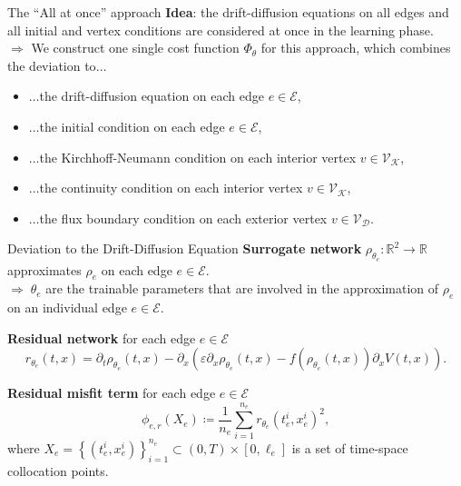 \documentclass[9pt]{beamer}
\begin{document}
\begin{frame}{The “All at once” approach}
    \textbf{Idea}: the drift-diffusion equations on all edges and all initial and vertex conditions are considered at once in the learning phase. \\
    \vspace{5mm}
    $\Rightarrow$ We construct one single cost function $\Phi_{\theta}$ for this approach, which combines the deviation to$\ldots$
    \begin{itemize}
        \item $\ldots$the drift-diffusion equation on each edge $e \in \mathcal{E}$,
        \item $\ldots$the initial condition on each edge $e \in \mathcal{E}$,
        \item $\ldots$the Kirchhoff-Neumann condition on each interior vertex $v \in \mathcal{V}_{\mathcal{K}}$,
        \item $\ldots$the continuity condition on each interior vertex $v \in \mathcal{V}_{\mathcal{K}}$,
        \item $\ldots$the flux boundary condition on each exterior vertex $v \in \mathcal{V}_{\mathcal{D}}$.
    \end{itemize} 
\end{frame}



\begin{frame}{Deviation to the Drift-Diffusion Equation}
    \textbf{Surrogate network} $\rho_{\theta_e} \colon \mathbb{R}^2 \to \mathbb{R}$ approximates $\rho_e$ on each edge $e \in \mathcal{E}$. \\
    $\Rightarrow \; \theta_e$ are the trainable parameters that are involved in the approximation of $\rho_e$ on an individual edge $e \in \mathcal{E}$. \\

    \vspace{3mm}

    \textbf{Residual network} for each edge $e \in \mathcal{E}$
    \begin{equation*}
        r_{\theta_e} \left( t,x \right)=\partial_t \rho_{\theta_e} \left( t,x \right) - \partial_x   \left(  \varepsilon \partial_x  \rho_{\theta_e} \left( t,x \right) - f \left( \rho_{\theta_e} \left( t,x \right) \right) \partial_x V \left( t,x \right) \right).
    \end{equation*}

    \vspace{3mm}

    \textbf{Residual misfit term} for each edge $e \in \mathcal{E}$
    \begin{equation*} 
        \phi_{e,r}  \left( X_e \right) \coloneqq \frac{1}{n_e} \sum_{i=1}^{n_e} r_{\theta_e}  \left( t_e^i, x_e^i  \right)^2,
    \end{equation*} 
    where $X_e = \left\{ \left( t_e^i, x_e^i \right) \right\}_{i=1}^{n_e} \subset \left( 0, T \right) \times \left[0, \ell_e\right]$ is a set of time-space collocation points. \\
\end{frame}
\end{document}
